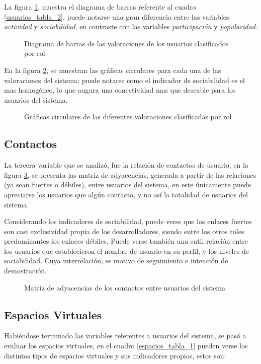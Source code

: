 La figura \ref{usuarios_bars_2}, muestra el diagrama de barras referente al
cuadro \ref{usuarios_tabla_2}, puede notarse una gran diferencia entre las
variables \emph{actividad} y \emph{sociabilidad}, en contraste con las variables
\emph{participación} y \emph{popularidad}.

\begin{figure}
\centering

\caption{Diagrama de barras de las valoraciones de los usuarios clasificados por
rol}
\label{usuarios_bars_2}
\end{figure}

En la figura \ref{usuarios_pie_2}, se muestran las gráficas circulares para cada
una de las valoraciones del sistema; puede notarse como el indicador de
sociabilidad es el mas homogéneo, lo que augura una conectividad mas que
deseable para los usuarios del sistema.

\begin{figure}
\centering

\caption{Gráficas circulares de las diferentes valoraciones clasificadas por
rol}
\label{usuarios_pie_2}
\end{figure}

\subsection{Contactos}
La tercera variable que se analizó, fue la relación de contactos de usuario,
en la figura \ref{contactos_matriz}, se presenta las matriz de adyacencias,
generada a partir de las relaciones (ya sean fuertes o débiles), entre usuarios
del sistema, en este únicamente puede apreciarse los usuarios que algún
contacto, y no así la totalidad de usuarios del sistema.

Considerando los indicadores de sociabilidad,  puede verse que los enlaces
fuertes son casi exclusividad propia de los desarrolladores, siendo entre los
otros roles predominantes los enlaces débiles. Puede verse también una sutil
relación entre los usuarios que establecieron el nombre de usuario en su perfil,
y los niveles de sociabilidad. Cuya interrelación, es motivo de seguimiento e
intención de demostración.

\begin{figure}
\centering

\caption{Matriz de adyacencias de los contactos entre usuarios del sistema}
\label{contactos_matriz}
\end{figure}

\subsection{Espacios Virtuales}
Habiéndose terminado las variables referentes a usuarios del sistema, se pasó a
evaluar los espacios virtuales, en el cuadro \ref{espacios_tabla_1} pueden verse
los distintos tipos de espacios virtuales y sus indicadores propios, estos son:

